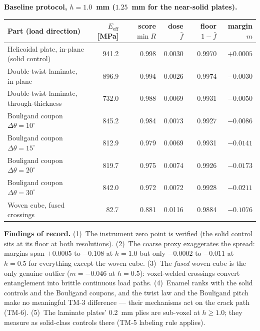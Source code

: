 \documentclass[11pt]{article}
\begin{document}
\noindent\textbf{Baseline protocol, $h = 1.0$~mm ($1.25$~mm for the near-solid plates).}
\begin{center}\small
\begin{tabular}{lrrrrr}
\toprule
Part (load direction) & $E_{\mathrm{eff}}$ [MPa] & score $\min R$ & dose $\bar f$ & floor $1{-}\bar f$ & margin $m$ \\
\midrule
Helicoidal plate, in-plane (solid control) & 941.2 & 0.998 & 0.0030 & 0.9970 & $+0.0005$ \\
Double-twist laminate, in-plane & 896.9 & 0.994 & 0.0026 & 0.9974 & $-0.0030$ \\
Double-twist laminate, through-thickness & 732.0 & 0.988 & 0.0069 & 0.9931 & $-0.0050$ \\
Bouligand coupon $\Delta\theta=10^\circ$ & 845.2 & 0.984 & 0.0073 & 0.9927 & $-0.0086$ \\
Bouligand coupon $\Delta\theta=15^\circ$ & 812.9 & 0.979 & 0.0069 & 0.9931 & $-0.0141$ \\
Bouligand coupon $\Delta\theta=20^\circ$ & 819.7 & 0.975 & 0.0074 & 0.9926 & $-0.0173$ \\
Bouligand coupon $\Delta\theta=30^\circ$ & 842.0 & 0.972 & 0.0072 & 0.9928 & $-0.0211$ \\
Woven cube, fused crossings & 82.7 & 0.881 & 0.0116 & 0.9884 & $-0.1076$ \\
\bottomrule
\end{tabular}
\end{center}

\noindent\textbf{Findings of record.}
(1)~The instrument zero point is verified (the solid control sits at its floor at both resolutions).
(2)~The coarse proxy exaggerates the spread: margins span $+0.0005$ to $-0.108$ at $h=1.0$ but only
$-0.0002$ to $-0.011$ at $h=0.5$ for everything except the woven cube.
(3)~The \emph{fused} woven cube is the only genuine outlier ($m = -0.046$ at $h=0.5$): voxel-welded
crossings convert entanglement into brittle continuous load paths.
(4)~Enamel ranks with the solid controls and the Bouligand coupons, and the twist law and the Bouligand
pitch make no meaningful TM-3 difference --- their mechanisms act on the crack path (TM-6).
(5)~The laminate plates' 0.2~mm plies are sub-voxel at $h \ge 1.0$; they measure as solid-class
controls there (TM-5 labeling rule applies).
\end{document}
